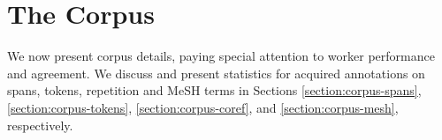 \documentclass[11pt,a4paper]{article}
\newenvironment{tight_enumerate}{
\begin{enumerate}[leftmargin=4.0mm]
  \setlength{\itemsep}{0pt}
  \setlength{\parskip}{0pt}
}{\end{enumerate}}
\begin{document}

\section{The Corpus}
\label{section:the-corpus}

We now present corpus details, paying special attention to worker performance and agreement. We discuss and present statistics for acquired annotations on spans, tokens, repetition and MeSH terms in Sections \ref{section:corpus-spans}, \ref{section:corpus-tokens}, \ref{section:corpus-coref}, and \ref{section:corpus-mesh}, respectively.
\end{document}
